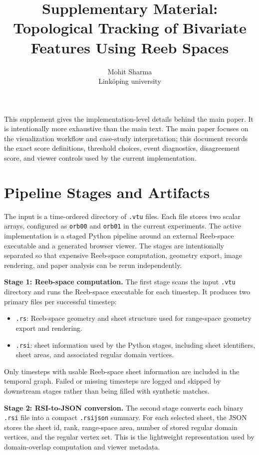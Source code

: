 \documentclass{vgtc}
\title{Supplementary Material: Topological Tracking of Bivariate Features Using Reeb Spaces}
\author{Mohit Sharma\\ %
        \scriptsize Link\"oping university}
\newcommand{\myparagraph}[1]{\vspace{1mm} \noindent \textbf{#1}}
\begin{document}
\maketitle

This supplement gives the implementation-level details behind the main paper. It is intentionally more exhaustive than the main text. The main paper focuses on the visualization workflow and case-study interpretation; this document records the exact score definitions, threshold choices, event diagnostics, disagreement score, and viewer controls used by the current implementation.

\section{Pipeline Stages and Artifacts}

The input is a time-ordered directory of \texttt{.vtu} files. Each file stores two scalar arrays, configured as \texttt{orb00} and \texttt{orb01} in the current experiments. The active implementation is a staged Python pipeline around an external Reeb-space executable and a generated browser viewer. The stages are intentionally separated so that expensive Reeb-space computation, geometry export, image rendering, and paper analysis can be rerun independently.

\myparagraph{Stage 1: Reeb-space computation.}
The first stage scans the input \texttt{.vtu} directory and runs the Reeb-space executable for each timestep. It produces two primary files per successful timestep:
\begin{itemize}[leftmargin=*]
  \item \texttt{.rs}: Reeb-space geometry and sheet structure used for range-space geometry export and rendering.
  \item \texttt{.rsi}: sheet information used by the Python stages, including sheet identifiers, sheet areas, and associated regular domain vertices.
\end{itemize}
Only timesteps with usable Reeb-space sheet information are included in the temporal graph. Failed or missing timesteps are logged and skipped by downstream stages rather than being filled with synthetic matches.

\myparagraph{Stage 2: RSI-to-JSON conversion.}
The second stage converts each binary \texttt{.rsi} file into a compact \texttt{.rsijson} summary. For each selected sheet, the JSON stores the sheet id, rank, range-space area, number of stored regular domain vertices, and the regular vertex set. This is the lightweight representation used by domain-overlap computation and viewer metadata.
\end{document}
